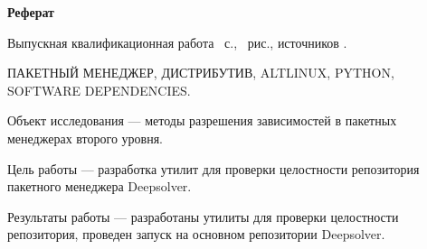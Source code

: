\begin{center}
	\textbf{Реферат}
\end{center}

Выпускная квалификационная работа ~с., ~рис., источников .

ПАКЕТНЫЙ МЕНЕДЖЕР, ДИСТРИБУТИВ, ALTLINUX, PYTHON, SOFTWARE DEPENDENCIES.

Объект исследования --- методы разрешения зависимостей в пакетных менеджерах второго уровня.

Цель работы --- разработка утилит для проверки целостности репозитория пакетного менеджера Deepsolver.

Результаты работы --- разработаны утилиты для проверки целостности репозитория, проведен запуск
на основном репозитории Deepsolver.

